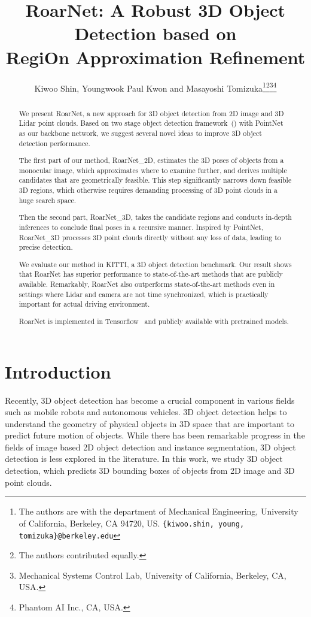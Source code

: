 \documentclass[letterpaper, 10 pt, conference]{ieeeconf}
\title{\LARGE \bf
RoarNet: A Robust 3D Object Detection based on \\
RegiOn Approximation Refinement
}
\author{Kiwoo Shin, Youngwook Paul Kwon and Masayoshi Tomizuka\thanks{The authors are with the department of Mechanical Engineering, University of California, Berkeley, CA 94720, US. {\tt\footnotesize \{kiwoo.shin, young, tomizuka\}@berkeley.edu}}\thanks{The authors contributed equally.}\thanks{Mechanical Systems Control Lab, University of California, Berkeley, CA, USA.}\thanks{Phantom AI Inc., CA, USA.}}
\begin{document}
\maketitle
\thispagestyle{empty}
\pagestyle{empty}


\begin{abstract}
We present RoarNet, a new approach for 3D object detection from 2D image and 3D Lidar point clouds.
Based on two stage object detection framework~(\cite{girshick_fast_2015, ren_faster_2015}) with PointNet~\cite{qi_pointnet_2017} as our backbone network, we suggest several novel ideas to improve 3D object detection performance.

The first part of our method, RoarNet\_2D, estimates the 3D poses of objects from a monocular image, which approximates where to examine further, and derives multiple candidates that are geometrically feasible. This step significantly narrows down feasible 3D regions, which otherwise requires demanding processing of 3D point clouds in a huge search space.

Then the second part, RoarNet\_3D, takes the candidate regions and conducts in-depth inferences to conclude final poses in a recursive manner. Inspired by PointNet, RoarNet\_3D processes 3D point clouds directly without any loss of data, leading to precise detection.


We evaluate our method in KITTI, a 3D object detection benchmark. Our result shows that RoarNet has superior performance to state-of-the-art methods that are publicly available.
Remarkably, RoarNet also outperforms state-of-the-art methods even in settings where Lidar and camera are not time synchronized, which is practically important for actual driving environment.

RoarNet is implemented in Tensorflow~\cite{Abadi:2016:TSL:3026877.3026899} and publicly available with pretrained models.
\end{abstract}




\section{Introduction}


Recently, 3D object detection has become a crucial component in various fields such as mobile robots and autonomous vehicles. 3D object detection helps to understand the geometry of physical objects in 3D space that are important to predict future motion of objects. While there has been remarkable progress in the fields of image based 2D object detection and instance segmentation, 3D object detection is less explored in the literature. In this work, we study 3D object detection, which predicts 3D bounding boxes of objects from 2D image and 3D point clouds.
\end{document}
